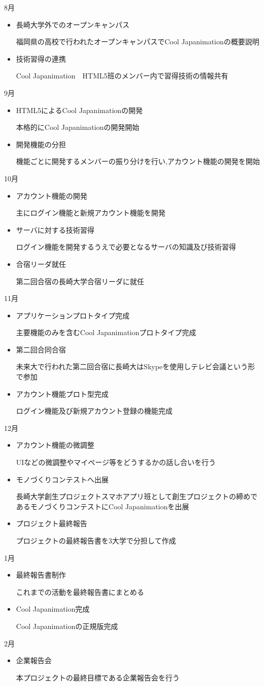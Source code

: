 8月
\begin{itemize}
\item 長崎大学外でのオープンキャンパス
\par 福岡県の高校で行われたオープンキャンパスでCool Japanimationの概要説明
\item 技術習得の連携
\par Cool Japanimation　HTML5班のメンバー内で習得技術の情報共有
\end{itemize}
9月
\begin{itemize}
\item HTML5によるCool Japanimationの開発
\par 本格的にCool Japanimationの開発開始
\item 開発機能の分担
\par 機能ごとに開発するメンバーの振り分けを行い,アカウント機能の開発を開始
\end{itemize}
10月
\begin{itemize}
\item アカウント機能の開発
\par 主にログイン機能と新規アカウント機能を開発
\item サーバに対する技術習得
\par ログイン機能を開発するうえで必要となるサーバの知識及び技術習得
\item 合宿リーダ就任
\par 第二回合宿の長崎大学合宿リーダに就任
\end{itemize}
11月
\begin{itemize}
\item アプリケーションプロトタイプ完成
\par 主要機能のみを含むCool Japanimationプロトタイプ完成
\item 第二回合同合宿
\par 未来大で行われた第二回合宿に長崎大はSkypeを使用しテレビ会議という形で参加
\item アカウント機能プロト型完成
\par ログイン機能及び新規アカウント登録の機能完成
\end{itemize}
12月
\begin{itemize}
\item アカウント機能の微調整
\par UIなどの微調整やマイページ等をどうするかの話し合いを行う
\item モノづくりコンテストへ出展
\par 長崎大学創生プロジェクトスマホアプリ班として創生プロジェクトの締めであるモノづくりコンテストにCool Japanimationを出展
\item プロジェクト最終報告
\par プロジェクトの最終報告書を3大学で分担して作成
\end{itemize}
1月
\begin{itemize}
\item 最終報告書制作
\par これまでの活動を最終報告書にまとめる
\item Cool Japanimation完成
\par Cool Japanimationの正規版完成
\end{itemize}
2月
\begin{itemize}
\item 企業報告会
\par 本プロジェクトの最終目標である企業報告会を行う
\end{itemize}

